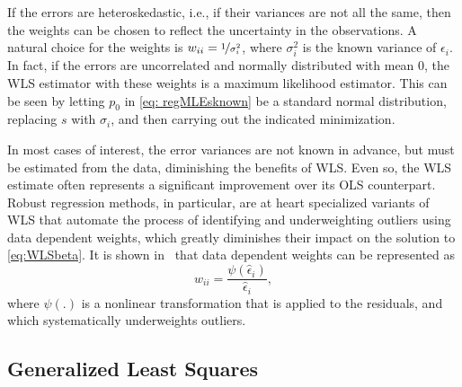 \documentclass[graybox,envcountchap,sectrefs]{svmono}\usepackage[]{graphicx}\usepackage[]{xcolor}
\begin{document}
\begin{appendices}
If the errors are heteroskedastic, i.e., if their variances are not
all the same, then the weights can be chosen to reflect the uncertainty
in the observations. A natural choice for the weights is $w_{ii}=\nicefrac{1}{\sigma_{i}^{2}}$,
where $\sigma_{i}^{2}$ is the known variance of $\epsilon_{i}$.
In fact, if the errors are uncorrelated and normally distributed with
mean 0, the WLS estimator with these weights is a maximum likelihood
estimator. This can be seen by letting $p_{0}$ in \eqref{eq: regMLEsknown}
be a standard normal distribution, replacing $s$ with $\sigma_{i}$,
and then carrying out the indicated minimization.

In most cases of interest, the error variances are not known in advance,
but must be estimated from the data, diminishing the benefits of WLS.
Even so, the WLS estimate often represents a significant improvement
over its OLS counterpart. Robust regression methods, in particular,
are at heart specialized variants of WLS that automate the process
of identifying and underweighting outliers using data dependent weights,
which greatly diminishes their impact on the solution to \eqref{eq:WLSbeta}.
It is shown in \RobustMethodsChapters\ that data dependent weights
can be represented as
\begin{equation}
w_{ii}=\frac{\psi\left(\hat{\epsilon}_{i}\right)}{\hat{\epsilon}_{i}},\label{eq:RobustRegressionW}
\end{equation}
where $\psi\left(.\right)$ is a nonlinear transformation that is
applied to the residuals, and which systematically underweights outliers.

\subsection{Generalized Least Squares}


\end{appendices}
\end{document}
